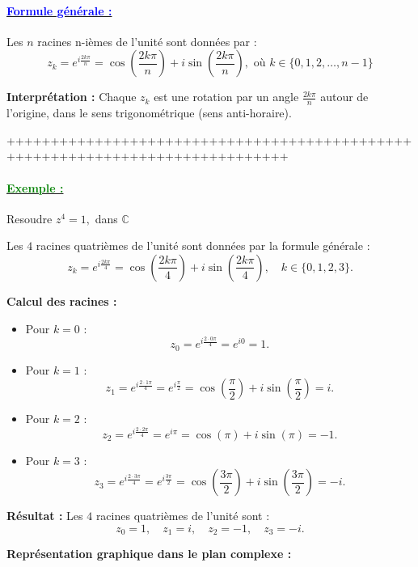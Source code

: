 \documentclass[12pt]{article}
\begin{document}
\paragraph{\underline{\textbf{\textcolor{blue}{Formule générale :}}}}

Les \(n\) racines n-ièmes de l’unité sont données par :
\[
z_k = e^{i\frac{2k\pi}{n}} = \cos\left(\frac{2k\pi}{n}\right) + i\sin\left(\frac{2k\pi}{n}\right), \text{ où } k \in \{0, 1, 2, \ldots, n-1\}
\]

\textbf{Interprétation :} Chaque \(z_k\) est une rotation par un angle \(\frac{2k\pi}{n}\) autour de l’origine, dans le sens trigonométrique (sens anti-horaire). 

++++++++++++++++++++++++++++++++++++++++++++++++++++++++++++++++++++++++++++++

\paragraph{\underline{\textbf{\textcolor{green}{Exemple : }}}}

Resoudre \( z^4 = 1, \) dans $\mathbb{C}$

Les \(4\) racines quatrièmes de l’unité sont données par la formule générale :
\[
z_k = e^{i\frac{2k\pi}{4}} = \cos\left(\frac{2k\pi}{4}\right) + i\sin\left(\frac{2k\pi}{4}\right), \quad k \in \{0, 1, 2, 3\}.
\]

\textbf{Calcul des racines :}
\begin{itemize}
    \item Pour \(k = 0\) : 
    \[
    z_0 = e^{i\frac{2\cdot 0\pi}{4}} = e^{i0} = 1.
    \]
    \item Pour \(k = 1\) : 
    \[
    z_1 = e^{i\frac{2\cdot 1\pi}{4}} = e^{i\frac{\pi}{2}} = \cos\left(\frac{\pi}{2}\right) + i\sin\left(\frac{\pi}{2}\right) = i.
    \]
    \item Pour \(k = 2\) : 
    \[
    z_2 = e^{i\frac{2\cdot 2\pi}{4}} = e^{i\pi} = \cos(\pi) + i\sin(\pi) = -1.
    \]
    \item Pour \(k = 3\) : 
    \[
    z_3 = e^{i\frac{2\cdot 3\pi}{4}} = e^{i\frac{3\pi}{2}} = \cos\left(\frac{3\pi}{2}\right) + i\sin\left(\frac{3\pi}{2}\right) = -i.
    \]
\end{itemize}

\textbf{Résultat :} Les \(4\) racines quatrièmes de l’unité sont :
\[
z_0 = 1, \quad z_1 = i, \quad z_2 = -1, \quad z_3 = -i.
\]

\textbf{Représentation graphique dans le plan complexe :}
\end{document}
